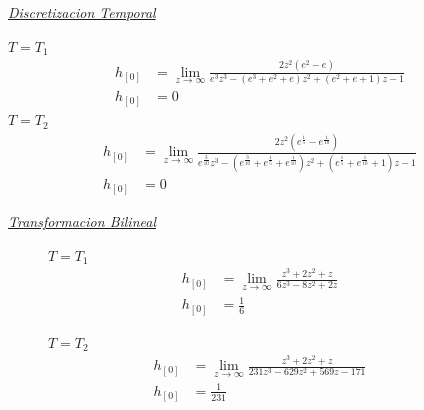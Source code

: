 \documentclass[a4paper,12pt]{report}
\begin{document}
\begin{enumerate}[label=\alph*), left=0pt]
                {\centering\underline{\textit{Discretizacion Temporal}}\par}
                $T = T_1$
                \begin{align*}
                    h_{[0]} &= \lim_{z \to \infty} \frac{2 z^2  (e^2 - e)}{e^3z^3-(e^3+e^2+e)z^2+(e^2+e+1)z-1}\\
                    h_{[0]} &= 0
                \end{align*}
                $T = T_2$
                \begin{align*}
                    h_{[0]} &= \lim_{z \to \infty} \frac{2 z^2 (e^{\frac{1}{5}} - e^{\frac{1}{10}})}
                        {e^{\frac{3}{10}}z^3 - (e^{\frac{3}{10}} + e^{\frac{1}{5}} + e^{\frac{1}{10}})z^2
                        + (e^{\frac{1}{5}} + e^{\frac{1}{10}} + 1)z - 1}\\
                    h_{[0]} &= 0
                \end{align*}

                {\centering\underline{\textit{Transformacion Bilineal}}\par}
                \begin{figure}[h!]
                    \centering
                    \begin{minipage}{0.4\textwidth}
                        \centering
                        $T = T_1$
                        \begin{align*}
                            h_{[0]} &= \lim_{z \to \infty} \frac{z^3 + 2z^2 + z}{6z^3 - 8z^2 + 2z}\\
                            h_{[0]} &= \frac{1}{6}
                        \end{align*}
                    \end{minipage}
                    \hspace{0.5cm}
                    \begin{minipage}{0.4\textwidth}
                        \centering
                        $T = T_2$
                        \begin{align*}
                            h_{[0]} &= \lim_{z \to \infty} \frac{z^3 + 2z^2 + z}{231z^3 - 629z^2 + 569z - 171}\\
                            h_{[0]} &= \frac{1}{231}
                        \end{align*}
                    \end{minipage}
                \end{figure}


\end{enumerate}
\end{document}
